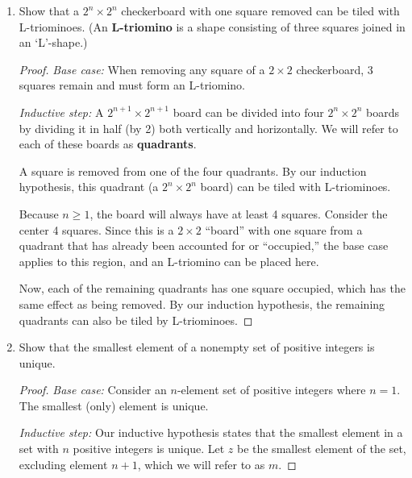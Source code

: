 \documentclass{article}
\newenvironment{answer}{
\begin{quote}}{
\end{quote}}
\begin{document}
\begin{enumerate}
\begin{answer}
\begin{proof}
        \begin{align*}
          \frac{1}{1 \cdot 2} + \frac{1}{2 \cdot 3} &+ \ldots +
          \frac{1}{n(n+1)} + \frac{1}{(n+1)(n+2)}\\
          &= \frac{n}{n+1} + \frac{1}{(n+1)(n+2)} \\
          &= \frac{n(n+2)+1}{(n+1)(n+2)} \\
          &= \frac{n^2+2n+1}{(n+1)(n+2)} \\
          &= \frac{n+1}{n+2}
          .
        \end{align*}
      \end{proof}
    \end{answer}

  \item Show that a $2^n \times 2^n$ checkerboard with one square
    removed can be tiled with L-triominoes. (An \textbf{L-triomino}
    is a shape consisting of three squares joined in an `L'-shape.)

    \begin{proof}
      \textit{Base case:} When removing any square of a $2\times 2$
      checkerboard, 3 squares remain and must form an L-triomino.

      \textit{Inductive step:} A $2^{n+1}\times 2^{n+1}$ board can be
      divided into four $2^n \times 2^n$ boards by dividing it in
      half (by 2) both vertically and horizontally. We will refer to
      each of these boards as \textbf{quadrants}.

      A square is removed from one of the four quadrants. By our
      induction hypothesis, this quadrant (a $2^n \times 2^n$ board)
      can be tiled with L-triominoes.

      Because $n\ge 1$, the board will always have at least 4
      squares. Consider the center 4 squares. Since this is a
      $2\times 2$ ``board'' with one square from a quadrant that has
      already been accounted for or ``occupied,'' the base case
      applies to this region, and an L-triomino can be placed here.

      Now, each of the remaining quadrants has one square occupied,
      which has the same effect as being removed. By our induction
      hypothesis, the remaining quadrants can also be tiled by L-triominoes.
    \end{proof}

  \item Show that the smallest element of a nonempty set of positive
    integers is unique.

    \begin{proof}
      \textit{Base case:} Consider an $n$-element set of positive
      integers where $n=1$. The smallest (only) element is unique.

      \textit{Inductive step:} Our inductive hypothesis states that
      the smallest element in a set with $n$ positive integers is
      unique. Let $z$ be the smallest element of the set, excluding
      element $n+1$, which we will refer to as $m$.
    \end{proof}

\end{enumerate}
\end{document}
